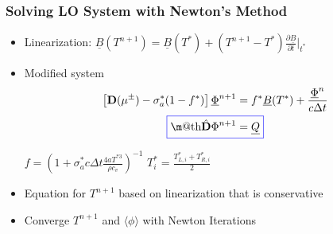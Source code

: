 \documentclass[xcolor=dvipsnames,hyperref={pdfpagelabels=false},unknownkeysallowed,
handout]{beamer}
\makeatletter
\newcommand*{\boxedcolor}{blue}
\renewcommand{\boxed}[1]{\textcolor{\boxedcolor}{%
  \fbox{\normalcolor\m@th$\displaystyle#1$}}}
\renewcommand{\u}[1]{\underline{#1}}
\newlength{\wideitemsep}
\let\olditem\item
\renewcommand{\item}{\setlength{\itemsep}{\wideitemsep}\olditem}
\newcommand{\pderiv}[2]{\frac{\partial #1}{\partial #2}}
\newcommand{\B}[1]{\ensuremath{\mathbf{#1}}}
\newcommand{\mom}[1]{\langle #1 \rangle}
\makeatother
\begin{document}
\begin{frame}
    \frametitle{Solving LO System with Newton's Method}
    \begin{block}{}
    \begin{itemize}
        \item Linearization: $\displaystyle \u B(T^{n+1}) = \u B(T^*) + \left(T^{n+1} -
                T^*\right) \pderiv{\u B}{t}\bigg|_{t^*}$
        \vspace{-0.15in}
        \item Modified system
            \begin{gather*}
                \displaystyle \left[\B  D(\mu^\pm) - \sigma_a^*(1-f^*) \right]\underline
                \Phi^{n+1}  = f^* \u B(T^*) + \frac{ \underline \Phi^n}{c\Delta t} \\
                \boxed{\hat{ \B  D }\Phi^{n+1} = \underline Q}
            \end{gather*}
        \vspace{-0.07in}
        \begin{center}
         $\displaystyle f = \left( 1 + \sigma_a^*c \Delta t \frac{4aT^{*3}}{\rho
            c_v} \right)^{-1}$  \hspace{0.3in}
         $\displaystyle T_i^* = \frac{T^{*}_{L,i}+T^{*}_{R,i}}{2}$
     \end{center}
 \item Equation for $T^{n+1}$ based on linearization that is conservative
 \item Converge $T^{n+1}$ and $\mom{\phi}$ with Newton Iterations
 \end{itemize}
 \end{block}
\end{frame}
\end{document}
